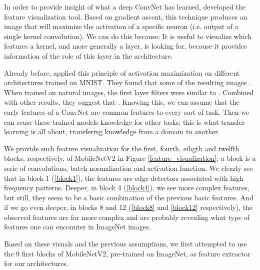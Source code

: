 \documentclass[12pt, a4paper]{report}
\begin{document}
					In order to provide insight of what a deep ConvNet has learned, \cite{olah2017feature} developed the feature visualization tool.
					Based on gradient ascent, this technique produces an image that will maximize the activation of a specific neuron (i.e. output of a single kernel convolution).
					We can do this because: 
					It is useful to visualize which features a kernel, and more generally a layer, is looking for, because it provides information of the role of this layer in the architecture.
					\par
					Already before, \cite{erhan2009visualizing} applied this principle of activation maximization on different architectures trained on MNIST.
					They found that some of the resulting images .
					When trained on natural images, the first layer filters were similar to .
					Combined with other results, they suggest that .
				Knowing this, we can assume that the early features of a ConvNet are common features to every sort of task.
				Then we can reuse these trained models knowledge for other tasks; this is what transfer learning is all about, transfering knowledge from a domain to another.
				\par
				We provide such feature visualization for the first, fourth, eihgth and twelfth blocks, respectively, of MobileNetV2 in Figure \ref{feature_visualization}; a block is a serie of convolutions, batch normalization and activation function.
				We clearly see that in block 1 (\ref{block1}), the features are edge detectors associated with high frequency patterns.
				Deeper, in block 4 (\ref{block4}), we see more complex features, but still, they seem to be a basic combination of the previous basic features.
				And if we go even deeper, in blocks 8 and 12 (\ref{block8} and \ref{block12} respectively), the observed features are far more complex and are probably revealing what type of features one can encounter in ImageNet images.
				\par
				Based on these visuals and the previous assumptions, we first attempted to use the 9 first blocks of MobileNetV2, pre-trained on ImageNet, as feature extractor for our architectures.
\end{document}
